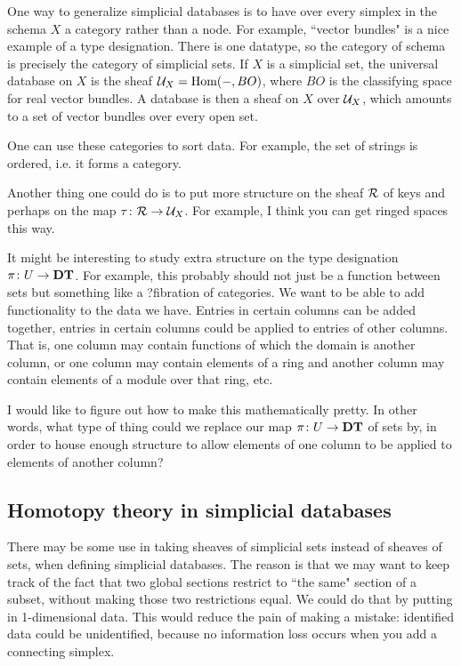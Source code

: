 \documentclass{amsart}
\def\DT{{\bf DT}}
\begin{document}
One way to generalize simplicial databases is to have over every simplex in the schema $X$ a category rather than a node.  For example, ``vector bundles" is a nice example of a type designation.  There is one datatype, so the category of schema is precisely the category of simplicial sets.  If $X$ is a simplicial set, the universal database on $X$ is the sheaf $\mathcal{U}_X=\textnormal{Hom}(-,BO)$, where $BO$ is the classifying space for real vector bundles.  A database is then a sheaf on $X$ over $\mathcal{U}_X$, which amounts to a set of vector bundles over every open set.

One can use these categories to sort data.  For example, the set of strings is ordered, i.e. it forms a category.   

Another thing one could do is to put more structure on the sheaf $\mathcal{R}$ of keys and perhaps on the map $\tau\colon\mathcal{R}\rightarrow\mathcal{U}_X$.  For example, I think you can get ringed spaces this way.  

It might be interesting to study extra structure on the type designation $\pi\taking U\to\DT$.  For example, this probably should not just be a function between sets but something like a ?fibration of categories.  We want to be able to add functionality to the data we have.  Entries in certain columns can be added together, entries in certain columns could be applied to entries of other columns.  That is, one column may contain functions of which the domain is another column, or one column may contain elements of a ring and another column may contain elements of a module over that ring, etc.  

I would like to figure out how to make this mathematically pretty.  In other words, what type of thing could we replace our map $\pi\taking U\to\DT$ of sets by, in order to house enough structure to allow elements of one column to be applied to elements of another column?

\subsection{Homotopy theory in simplicial databases}

There may be some use in taking sheaves of simplicial sets instead of sheaves of sets, when defining simplicial databases.  The reason is that we may want to keep track of the fact that two global sections restrict to ``the same" section of a subset, without making those two restrictions equal.  We could do that by putting in 1-dimensional data.  This would reduce the pain of making a mistake: identified data could be unidentified, because no information loss occurs when you add a connecting simplex.
\end{document}
